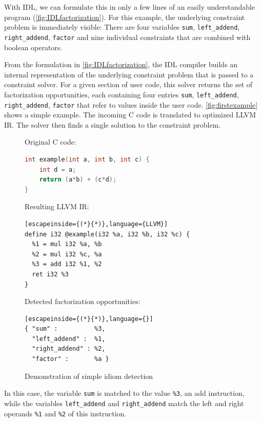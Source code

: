     With IDL, we can formulate this in only a few lines of an easily
    understandable program (\autoref{fig:IDLfactorization}).
    For this example, the underlying constraint problem is immediately visible:
    There are four variables \texttt{sum}, \texttt{left\_addend},
    \texttt{right\_addend}, \texttt{factor} and nine individual constraints
    that are combined with boolean operators.

    From the formulation in \autoref{fig:IDLfactorization}, the IDL compiler
    builds an internal representation of the underlying constraint problem that
    is passed to a constraint solver.
    For a given section of user code, this solver returns the set of
    factorization opportunities, each containing four entries
    \texttt{sum}, \texttt{left\_addend}, \texttt{right\_addend}, \texttt{factor}
    that refer to values inside the user code.
    \autoref{fig:firstexample} shows a simple example.
    The incoming C code is translated to optimized LLVM IR.
    The solver then finds a single solution to the constraint problem.

\begin{figure}[ht]
Original C code:
\begin{lstlisting}[language={C++}]
int example(int a, int b, int c) {
    int d = a;
    return (a*b) + (c*d);
}
\end{lstlisting}
\vspace{1em}
Resulting LLVM IR:
\begin{lstlisting}[escapeinside={(*}{*)},language={LLVM}]
define i32 @example(i32 %a, i32 %b, i32 %c) {
  %1 = mul i32 %a, %b
  %2 = mul i32 %c, %a
  %3 = add i32 %1, %2
  ret i32 %3
}
\end{lstlisting}
\vspace{1em}
Detected factorization opportunities:
\begin{lstlisting}[escapeinside={(*}{*)},language={}]
{ "sum" :          %3,
  "left_addend" :  %1,
  "right_addend" : %2,
  "factor" :       %a }
\end{lstlisting}
\vspace{-0.3cm}
\caption{Demonstration of simple idiom detection}
\label{fig:firstexample}
\end{figure}

    In this case, the variable {\tt sum} is matched to the value {\tt \%3}, an
    add instruction, while the variables {\tt left\_addend} and
    {\tt right\_addend} match the left and right operands {\tt \%1} and
    {\tt \%2} of this instruction. 

